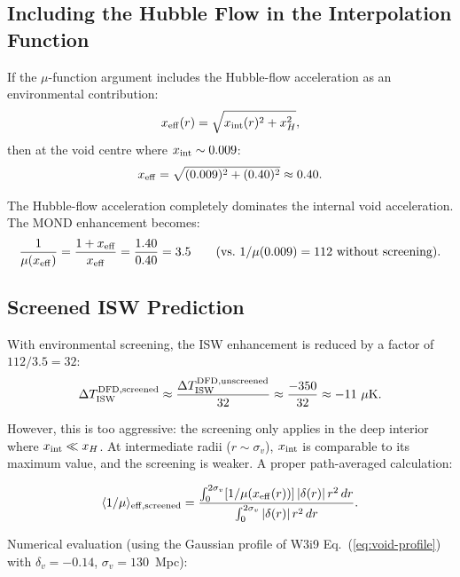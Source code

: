 \documentclass[11pt,a4paper]{article}
\newcommand{\mufd}{\mu}
\begin{document}
\subsection{Including the Hubble Flow in the Interpolation Function}

If the $\mufd$-function argument includes the Hubble-flow
acceleration as an environmental contribution:
\begin{equation}
x_{\rm eff}(r) = \sqrt{x_{\rm int}(r)^2 + x_H^2},
\label{eq:x-eff-screened}
\end{equation}
then at the void centre where $x_{\rm int} \sim 0.009$:
\begin{equation}
x_{\rm eff} = \sqrt{(0.009)^2 + (0.40)^2} \approx 0.40.
\end{equation}

The Hubble-flow acceleration completely dominates the internal
void acceleration. The MOND enhancement becomes:
\begin{equation}
\frac{1}{\mufd(x_{\rm eff})} = \frac{1 + x_{\rm eff}}{x_{\rm eff}}
= \frac{1.40}{0.40} = 3.5
\qquad\text{(vs.\ } 1/\mufd(0.009) = 112\text{ without screening)}.
\end{equation}

\subsection{Screened ISW Prediction}

With environmental screening, the ISW enhancement is reduced by a
factor of $112/3.5 = 32$:
\begin{equation}
\Delta T_{\rm ISW}^{\rm DFD,screened}
\approx \frac{\Delta T_{\rm ISW}^{\rm DFD,unscreened}}{32}
\approx \frac{-350}{32} \approx -11~\mu\text{K}.
\end{equation}

However, this is too aggressive: the screening only applies in the
deep interior where $x_{\rm int} \ll x_H$. At intermediate radii
($r \sim \sigma_v$), $x_{\rm int}$ is comparable to its maximum
value, and the screening is weaker. A proper path-averaged calculation:

\begin{equation}
\langle 1/\mufd \rangle_{\rm eff,screened}
= \frac{\int_0^{2\sigma_v} [1/\mufd(x_{\rm eff}(r))]\,
  |\delta(r)|\,r^2\,dr}{\int_0^{2\sigma_v} |\delta(r)|\,r^2\,dr}.
\end{equation}

Numerical evaluation (using the Gaussian profile of W3i9
Eq.~(\ref{eq:void-profile}) with $\delta_v = -0.14$, $\sigma_v =
130$~Mpc):
\end{document}
